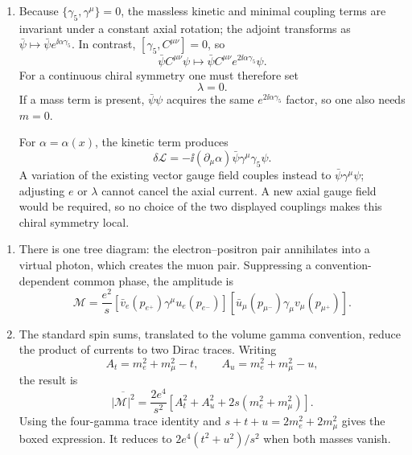 \begin{enumerate}
\begin{enumerate}
The current sourcing Maxwell's equation is
\[
 J_{\rm Max}^\nu
 =e j^\nu+2\ii\lambda\partial_\mu B^{\mu\nu}.
\]
The second term is an identically conserved magnetization current:
\(\partial_\nu\partial_\mu B^{\mu\nu}=0\).  Its contribution to the
integrated charge is a spatial boundary term, so for localized fields
\(\int \dd^3\mathbf x\,J_{\rm Max}^0=eQ\), even though the local source
density is not simply \(e j^0\).
\item
Because \(\{\gamma_5,\gamma^\mu\}=0\), the massless kinetic and minimal
coupling terms are invariant under a constant axial rotation; the adjoint
transforms as \(\bar\psi\mapsto\bar\psi e^{\ii\alpha\gamma_5}\).  In
contrast, \([\gamma_5,C^{\mu\nu}]=0\), so
\[
 \bar\psi C^{\mu\nu}\psi
 \longmapsto
 \bar\psi C^{\mu\nu}e^{2\ii\alpha\gamma_5}\psi.
\]
For a continuous chiral symmetry one must therefore set
\[
 \boxed{\lambda=0.}
\]
If a mass term is present, \(\bar\psi\psi\) acquires the same
\(e^{2\ii\alpha\gamma_5}\) factor, so one also needs \(m=0\).

For \(\alpha=\alpha(x)\), the kinetic term produces
\[
 \delta\mathcal L
 =-\ii(\partial_\mu\alpha)
 \bar\psi\gamma^\mu\gamma_5\psi.
\]
A variation of the existing vector gauge field couples instead to
\(\bar\psi\gamma^\mu\psi\); adjusting \(e\) or \(\lambda\) cannot cancel
the axial current.  A new axial gauge field would be required, so no
choice of the two displayed couplings makes this chiral symmetry local.
\end{enumerate}

\begin{enumerate}
\item
There is one tree diagram: the electron--positron pair annihilates into a
virtual photon, which creates the muon pair.  Suppressing a
convention-dependent common phase, the amplitude is
\[
 \boxed{
 \mathcal M
 =\frac{e^2}{s}
 \left[\bar v_e(p_{e^+})\gamma^\mu u_e(p_{e^-})\right]
 \left[\bar u_\mu(p_{\mu^-})\gamma_\mu
 v_\mu(p_{\mu^+})\right].}
\]

\item
The standard spin sums, translated to the volume gamma convention, reduce
the product of currents to two Dirac traces.  Writing
\[
 A_t=m_e^2+m_\mu^2-t,\qquad
 A_u=m_e^2+m_\mu^2-u,
\]
the result is
\[
 \boxed{
 \overline{|\mathcal M|^2}
 =\frac{2e^4}{s^2}
 \left[
 A_t^2+A_u^2+2s(m_e^2+m_\mu^2)
 \right].}
\]
Using the four-gamma trace identity and
\(s+t+u=2m_e^2+2m_\mu^2\) gives the boxed expression.  It reduces to
\(2e^4(t^2+u^2)/s^2\) when both masses vanish.


\end{enumerate}
\end{enumerate}
